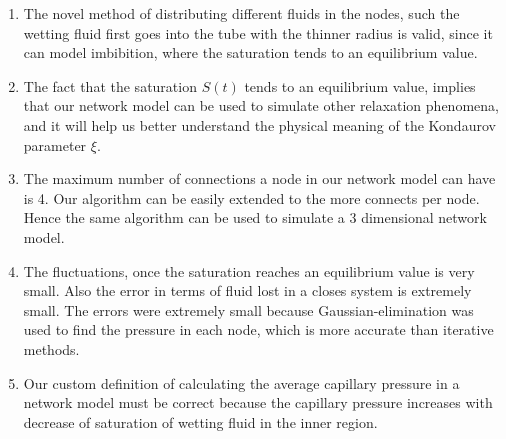 \begin{enumerate}
	\item The novel method of distributing different fluids in the nodes, such the wetting fluid first goes into the tube with the thinner radius is valid, since it can model imbibition, where the saturation tends to an equilibrium value.
	
	\item The fact that the saturation $S(t)$ tends to an equilibrium value, implies that our network model can be used to simulate other relaxation phenomena, and it will help us better understand the physical meaning of the Kondaurov parameter $\xi$.
	
	\item The maximum number of connections a node in our network model can have is 4. Our algorithm can be easily extended to the more connects per node. Hence the same algorithm can be used to simulate a 3 dimensional network model.
	
	\item The fluctuations, once the saturation reaches an equilibrium value is very small. Also the error in terms of fluid lost in a closes system is extremely small. The errors were extremely small because Gaussian-elimination was used to find the pressure in each node, which is more accurate than iterative methods.
	
	\item Our custom definition of calculating the average capillary pressure in a network model must be correct because the capillary pressure increases with decrease of saturation of wetting fluid in the inner region. 
\end{enumerate}


